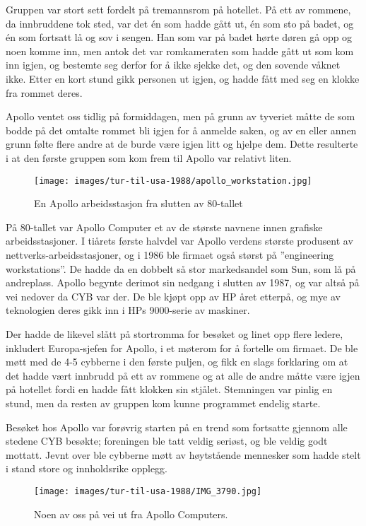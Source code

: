 Gruppen var stort sett fordelt på tremannsrom på hotellet. På ett av rommene, da innbruddene tok sted, var det én som hadde gått ut, én som sto på badet, og én som fortsatt lå og sov i sengen. Han som var på badet hørte døren gå opp og noen komme inn, men antok det var romkameraten som hadde gått ut som kom inn igjen, og bestemte seg derfor for å ikke sjekke det, og den sovende våknet ikke. Etter en kort stund gikk personen ut igjen, og hadde fått med seg en klokke fra rommet deres.

Apollo ventet oss tidlig på formiddagen, men på grunn av tyveriet måtte de som bodde på det omtalte rommet bli igjen for å anmelde saken, og av en eller annen grunn følte flere andre at de burde være igjen litt og hjelpe dem. Dette resulterte i at den første gruppen som kom frem til Apollo var relativt liten. 

\begin{figure}
	\texttt{[image: images/tur-til-usa-1988/apollo\_workstation.jpg]}
	\caption{En Apollo arbeidsstasjon fra slutten av 80-tallet}
\end{figure}

På 80-tallet var Apollo Computer et av de største navnene innen grafiske arbeidsstasjoner. I tiårets første halvdel var Apollo verdens største produsent av nettverks-arbeidsstasjoner, og i 1986 ble firmaet også størst på ''engineering workstations''. De hadde da en dobbelt så stor markedsandel som Sun, som lå på andreplass. Apollo begynte derimot sin nedgang i slutten av 1987, og var altså på vei nedover da CYB var der. De ble kjøpt opp av HP året etterpå, og mye av teknologien deres gikk inn i HPs 9000-serie av maskiner.

Der hadde de likevel slått på stortromma for besøket og linet opp flere ledere, inkludert Europa-sjefen for Apollo, i et møterom for å fortelle om firmaet. De ble møtt med de 4-5 cybberne i den første puljen, og fikk en slags forklaring om at det hadde vært innbrudd på ett av rommene og at alle de andre måtte være igjen på hotellet fordi en hadde fått klokken sin stjålet. Stemningen var pinlig en stund, men da resten av gruppen kom kunne programmet endelig starte.

Besøket hos Apollo var forøvrig starten på en trend som fortsatte gjennom alle stedene CYB besøkte; foreningen ble tatt veldig seriøst, og ble veldig godt mottatt. Jevnt over ble cybberne møtt av høytstående mennesker som hadde stelt i stand store og innholdsrike opplegg. 

\begin{figure}
	\texttt{[image: images/tur-til-usa-1988/IMG\_3790.jpg]}
	\caption{Noen av oss på vei ut fra Apollo Computers.}
\end{figure}

